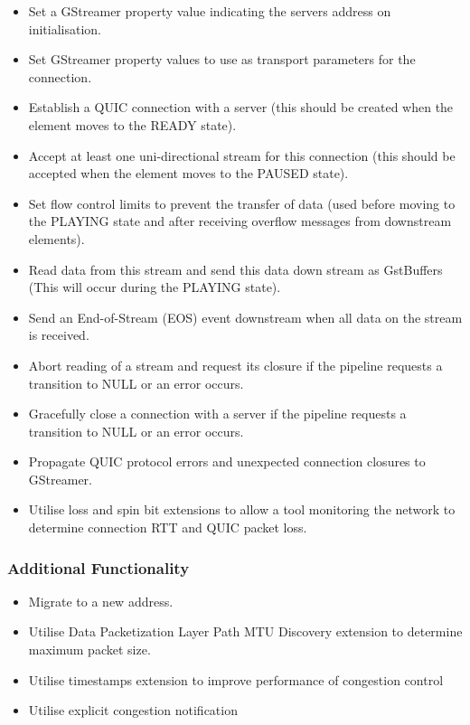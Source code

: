 \documentclass[11pt]{article}
\begin{document}
\begin{itemize}
    \item Set a GStreamer property value indicating the servers address on initialisation.
    \item Set GStreamer property values to use as transport parameters for the connection.
    \item Establish a QUIC connection with a server (this should be created when the element moves to the READY state).
    \item Accept at least one uni-directional stream for this connection (this should be accepted when the element moves to the PAUSED state).
    \item Set flow control limits to prevent the transfer of data (used before moving to the PLAYING state and after receiving overflow messages from downstream elements).
    \item Read data from this stream and send this data down stream as GstBuffers (This will occur during the PLAYING state).
    \item Send an End-of-Stream (EOS) event downstream when all data on the stream is received.
    \item Abort reading of a stream and request its closure if the pipeline requests a transition to NULL or an error occurs.
    \item Gracefully close a connection with a server if the pipeline requests a transition to NULL or an error occurs.
    \item Propagate QUIC protocol errors and unexpected connection closures to GStreamer.
    \item Utilise loss and spin bit extensions to allow a tool monitoring the network to determine connection RTT and QUIC packet loss.
\end{itemize}


\subsubsection{Additional Functionality}


\begin{itemize}
    \item Migrate to a new address.
    \item Utilise Data Packetization Layer Path MTU Discovery extension to determine maximum packet size.
    \item Utilise timestamps extension to improve performance of congestion control
    \item Utilise explicit congestion notification
\end{itemize}
\bigskip
\end{document}
